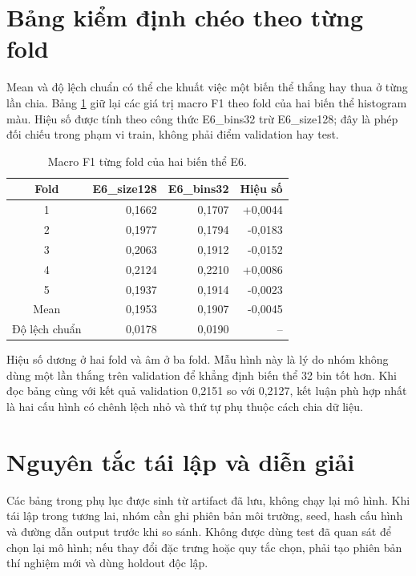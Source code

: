 \section{Bảng kiểm định chéo theo từng fold}
Mean và độ lệch chuẩn có thể che khuất việc một biến thể thắng hay thua ở từng lần chia. Bảng \ref{tab:cvfull} giữ lại các giá trị macro F1 theo fold của hai biến thể histogram màu. Hiệu số được tính theo công thức E6\_bins32 trừ E6\_size128; đây là phép đối chiếu trong phạm vi train, không phải điểm validation hay test.
\begin{table}[H]\centering\small
\caption{Macro F1 từng fold của hai biến thể E6.}\label{tab:cvfull}
\begin{tabular}{c|rrr}
\toprule
Fold & E6\_size128 & E6\_bins32 & Hiệu số \\
\midrule
1 & 0,1662 & 0,1707 & +0,0044\\
2 & 0,1977 & 0,1794 & -0,0183\\
3 & 0,2063 & 0,1912 & -0,0152\\
4 & 0,2124 & 0,2210 & +0,0086\\
5 & 0,1937 & 0,1914 & -0,0023\\
\midrule
Mean & 0,1953 & 0,1907 & -0,0045\\
Độ lệch chuẩn & 0,0178 & 0,0190 & --\\
\bottomrule
\end{tabular}
\end{table}
Hiệu số dương ở hai fold và âm ở ba fold. Mẫu hình này là lý do nhóm không dùng một lần thắng trên validation để khẳng định biến thể 32 bin tốt hơn. Khi đọc bảng cùng với kết quả validation 0,2151 so với 0,2127, kết luận phù hợp nhất là hai cấu hình có chênh lệch nhỏ và thứ tự phụ thuộc cách chia dữ liệu.
\section{Nguyên tắc tái lập và diễn giải}
Các bảng trong phụ lục được sinh từ artifact đã lưu, không chạy lại mô hình. Khi tái lập trong tương lai, nhóm cần ghi phiên bản môi trường, seed, hash cấu hình và đường dẫn output trước khi so sánh. Không được dùng test đã quan sát để chọn lại mô hình; nếu thay đổi đặc trưng hoặc quy tắc chọn, phải tạo phiên bản thí nghiệm mới và dùng holdout độc lập.
